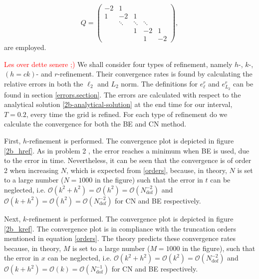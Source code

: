 \begin{equation*}
Q = \begin{pmatrix}
    -2 & 1 & & & \\
    1 & -2 & 1 & & \\
    & \ddots & \ddots & \ddots &\\
     & & 1 & -2 & 1 \\
     &  & & 1 & -2
    \end{pmatrix}, 
\end{equation*}
are employed. 

\textcolor{red}{Les over dette senere ;)}
We shall consider four types of refinement, namely $h$-, $k$-, $(h=ck)$- and $r$-refinement. Their convergence rates is found by calculating the relative errors in both the $\ell_2$ and $L_2$ norm. The definitions for $e_{\ell}^r$ and $e_{L_2}^r$ can be found in section \ref{errors.section}. The errors are calculated with respect to the analytical solution \eqref{2b-analytical-solution} at the end time for our interval, $T=0.2$, every time the grid is refined. For each type of refinement do we calculate the convergence for both the BE and CN method.

First, $h$-refinement is performed. The convergence plot is depicted in figure \ref{2b_href}. As in problem 2 , the error reaches a minimum when BE is used, due to the error in time. Nevertheless, it can be seen that the convergence is of order 2 when increasing $N$, which is expected from \eqref{orders}, because, in theory, $N$ is set to a large number ($N = 1000$ in the figure) such that the error in $t$ can be neglected, i.e. $\mathcal{O}(k^2 + h^2) = \mathcal{O}(h^2) = \mathcal{O}(N_{\mathrm{dof}}^{-2})$ and $\mathcal{O}(k + h^2) = \mathcal{O}(h^2) = \mathcal{O}(N_{\mathrm{dof}}^{-2})$ for CN and BE respectively. 

Next, $k$-refinement is performed. The convergence plot is depicted in figure \ref{2b_kref}. The convergence plot is in compliance with the truncation orders mentioned in equation \eqref{orders}. The theory predicts these convergence rates because, in theory, $M$ is set to a large number ($M = 1000$ in the figure), such that the error in $x$ can be neglected, i.e. $\mathcal{O}(k^2 + h^2) = \mathcal{O}(k^2) = \mathcal{O}(N_{\mathrm{dof}}^{-2})$ and $\mathcal{O}(k + h^2) = \mathcal{O}(k) = \mathcal{O}(N_{\mathrm{dof}}^{-1})$ for CN and BE respectively.

